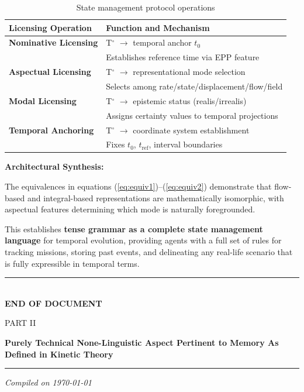 \documentclass[11pt]{article}
\theoremstyle{defstyle}
\theoremstyle{mapstyle}
\newenvironment{keyinsight}
{\begin{tcolorbox}[
  enhanced,
  colback=keybox,
  colframe=headerblue,
  boxrule=1.2pt,
  arc=4pt,
  left=10pt,right=10pt,top=10pt,bottom=10pt,
  before skip=12pt,after skip=12pt
]}
{\end{tcolorbox}}
\newcommand{\setdocheader}[1]{%
  \fancyhead[L]{\color{headerblue}\footnotesize\textbf{#1}}%
}
\newcommand{\PartDivider}[2]{%
  \clearpage
  \thispagestyle{empty}
  \begin{center}
    \vspace*{1.8cm}
    \begin{tcolorbox}[
      enhanced,
      breakable,
      colback=partbg,
      colframe=partframe,
      boxrule=1.2pt,
      arc=2.5mm,
      left=10mm,right=10mm,top=8mm,bottom=8mm,
      width=0.92\textwidth
    ]
      \centering
      {\Large\scshape\color{headerblue}#1}\par
      \vspace{0.6em}
      {\huge\bfseries\color{headerblue}#2}\par
      \vspace{0.9em}
      {\color{headerblue!70}\rule{0.72\textwidth}{0.9pt}}\par
      \vspace{0.8em}
      {\large\itshape\color{headerblue!85}Compiled on \today}\par
    \end{tcolorbox}
  \end{center}
  \clearpage
}
\begin{document}
\begin{table}[h]
\centering
\renewcommand{\arraystretch}{1.5}
\begin{tabular}{@{}>{\raggedright\bfseries}p{4cm}>{\raggedright\arraybackslash}p{8cm}@{}}
\toprule
\textbf{Licensing Operation} & \textbf{Function and Mechanism} \\
\midrule
Nominative Licensing & T$^\circ$ $\to$ temporal anchor $t_0$ \\
& Establishes reference time via EPP feature\\
\addlinespace
Aspectual Licensing & T$^\circ$ $\to$ representational mode selection \\
& Selects among rate/state/displacement/flow/field\\
\addlinespace
Modal Licensing & T$^\circ$ $\to$ epistemic status (realis/irrealis) \\
& Assigns certainty values to temporal projections\\
\addlinespace
Temporal Anchoring & T$^\circ$ $\to$ coordinate system establishment \\
& Fixes $t_0$, $t_{\text{ref}}$, interval boundaries\\
\bottomrule
\end{tabular}
\caption{State management protocol operations}
\end{table}

\begin{keyinsight}
\textbf{Architectural Synthesis:}

The equivalences in equations (\ref{eq:equiv1})--(\ref{eq:equiv2}) demonstrate that flow-based and integral-based representations are mathematically isomorphic, with aspectual features determining which mode is naturally foregrounded.

This establishes \textbf{tense grammar as a complete state management language} for temporal evolution, providing agents with a full set of rules for tracking missions, storing past events, and delineating any real-life scenario that is fully expressible in temporal terms.
\end{keyinsight}

\vspace{\baselineskip}
\begin{center}
\rule{0.8\textwidth}{0.5pt}\\
\textbf{END OF DOCUMENT}
\end{center}




\PartDivider{PART II}{Purely Technical None-Linguistic Aspect Pertinent to Memory As Defined in Kinetic Theory}
{}
\setdocheader{NON-LINGUISTIC MEMORY \& ERASURE}
\end{document}
